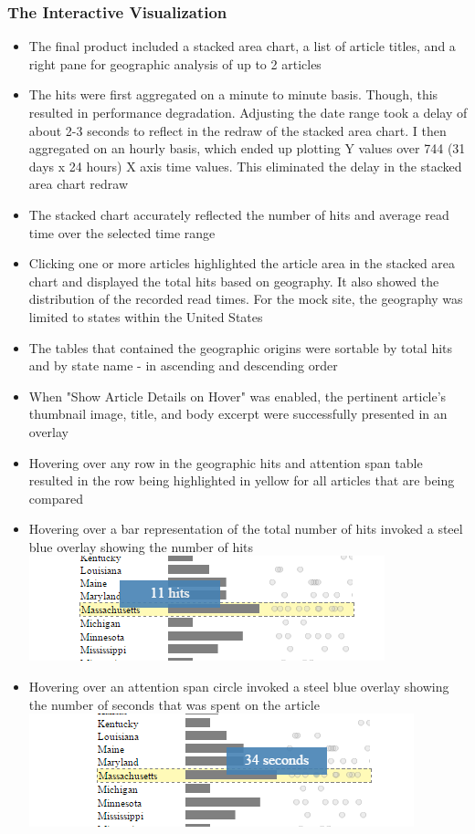 \documentclass[12pt]{article}
\begin{document}
\subsubsection{The Interactive Visualization}
\begin{itemize}
\item The final product included a stacked area chart, a list of article titles, and a right pane for geographic analysis of up to 2 articles
\item The hits were first aggregated on a minute to minute basis. Though, this resulted in performance degradation. Adjusting the date range took a delay of about 2-3 seconds to reflect in the redraw of the stacked area chart. I then aggregated on an hourly basis, which ended up plotting Y values over 744 (31 days x 24 hours) X axis time values. This eliminated the delay in the stacked area chart redraw
\item The stacked chart accurately reflected the number of hits and average read time over the selected time range
\item Clicking one or more articles highlighted the article area in the stacked area chart and displayed the total hits based on geography. It also showed the distribution of the recorded read times. For the mock site, the geography was limited to states within the United States
\item The tables that contained the geographic origins were sortable by total hits and by state name - in ascending and descending order
\item When "Show Article Details on Hover" was enabled, the pertinent article's thumbnail image, title, and body excerpt were successfully presented in an overlay
\item Hovering over any row in the geographic hits and attention span table resulted in the row being highlighted in yellow for all articles that are being compared
\item Hovering over a bar representation of the total number of hits invoked a steel blue overlay showing the number of hits
\\
\noindent\includegraphics[scale=0.8]{img/state_hit_hover} \\  

\item Hovering over an attention span circle invoked a steel blue overlay showing the number of seconds that was spent on the article
\noindent\includegraphics[scale=0.8]{img/state_circle_hover} \\  
\end{itemize} 
\end{document}
